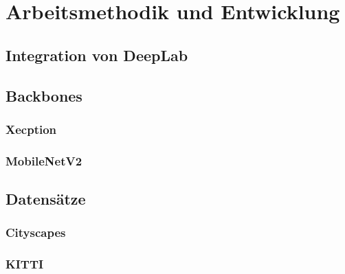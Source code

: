 \chapter{Arbeitsmethodik und Entwicklung}
	\section{Integration von DeepLab}
	\section{Backbones}
		\subsection{Xecption}
		\subsection{MobileNetV2}
	\section{Datensätze}
		\subsection{Cityscapes}
		\subsection{KITTI}